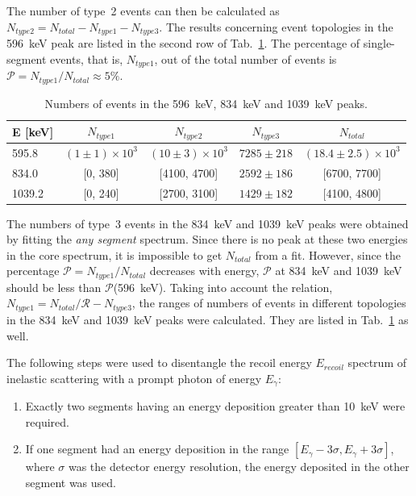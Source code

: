 \documentclass{elsart}
\begin{document}
The number of type~2 events can then be calculated as $N_{type2} =
N_{total} - N_{type1} - N_{type3}$. The results concerning event
topologies in the 596~keV peak are listed in the second row of
Tab.~\ref{tab:ncore}. The percentage of single-segment events, that
is, $N_{type1}$, out of the total number of events is $\mathcal{P} =
N_{type1} / N_{total} \approx 5\%$.
\begin{table}[tbhp] 
  \caption{Numbers of events in the 596~keV, 834~keV and 1039~keV peaks.} 
  \label{tab:ncore}
  \begin{tabular*}{\textwidth}{@{\extracolsep{\fill}}lcccc}\hline\hline
    E [keV]& $N_{type 1}$ & $N_{type 2}$  & $N_{type 3}$    & $N_{total}$   \\\hline
    595.8  & $(1 \pm 1)\times10^3$ & $(10 \pm 3)\times10^3$ & $7285 \pm 218$ & $(18.4 \pm 2.5)\times10^3$ \\
    834.0  & [0, 380]    & [4100, 4700] & $2592 \pm 186$ & [6700, 7700] \\
    1039.2 & [0, 240]    & [2700, 3100] & $1429 \pm 182$ & [4100, 4800] \\
    \hline\hline
  \end{tabular*}
\end{table}

The numbers of type~3 events in the 834~keV and 1039~keV peaks were
obtained by fitting the \emph{any segment} spectrum. Since there is no
peak at these two energies in the core spectrum, it is impossible to
get $N_{total}$ from a fit. However, since the percentage $\mathcal{P}
= N_{type1} / N_{total}$ decreases with energy, $\mathcal{P}$ at
834~keV and 1039~keV should be less than
$\mathcal{P}$(596~keV). Taking into account the relation, $N_{type1} =
N_{total}/\mathcal{R} - N_{type3}$, the ranges of numbers of events in
different topologies in the 834~keV and 1039~keV peaks were
calculated. They are listed in Tab.~\ref{tab:ncore} as well.


The following steps were used to disentangle the recoil energy
$E_{recoil}$ spectrum of inelastic scattering with a prompt photon of
energy $E_\gamma$:
\begin{enumerate}
\item Exactly two segments having an energy deposition greater than
  10~keV were required.
\item If one segment had an energy deposition in the range
  $[E_\gamma-3\sigma, E_\gamma+3\sigma]$, where $\sigma$ was the
  detector energy resolution, the energy deposited in the other
  segment was used.
\end{enumerate}
\end{document}
